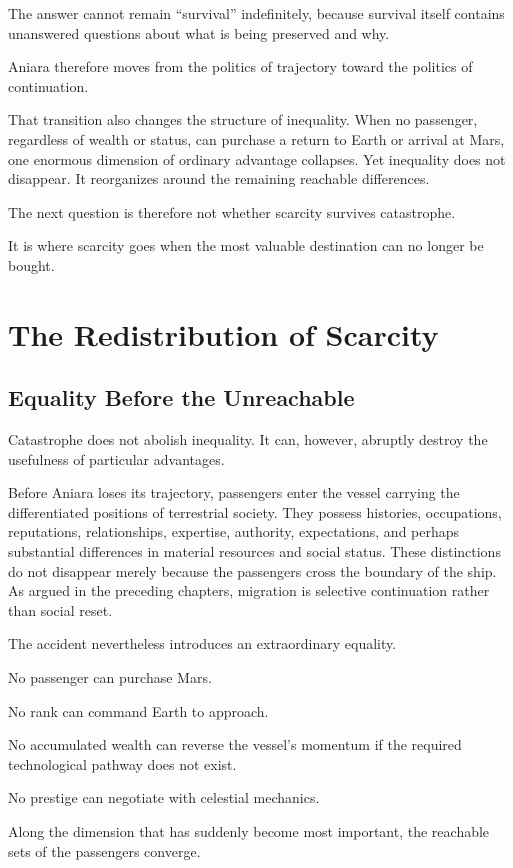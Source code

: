 \documentclass[11pt,oneside]{book}
\theoremstyle{definition}
\theoremstyle{remark}
\begin{document}
The answer cannot remain ``survival'' indefinitely, because survival itself contains unanswered questions about what is being preserved and why.

Aniara therefore moves from the politics of trajectory toward the politics of continuation.

That transition also changes the structure of inequality. When no passenger, regardless of wealth or status, can purchase a return to Earth or arrival at Mars, one enormous dimension of ordinary advantage collapses. Yet inequality does not disappear. It reorganizes around the remaining reachable differences.

The next question is therefore not whether scarcity survives catastrophe.

It is where scarcity goes when the most valuable destination can no longer be bought.

\chapter{The Redistribution of Scarcity}

\section{Equality Before the Unreachable}

Catastrophe does not abolish inequality. It can, however, abruptly destroy the usefulness of particular advantages.

Before Aniara loses its trajectory, passengers enter the vessel carrying the differentiated positions of terrestrial society. They possess histories, occupations, reputations, relationships, expertise, authority, expectations, and perhaps substantial differences in material resources and social status. These distinctions do not disappear merely because the passengers cross the boundary of the ship. As argued in the preceding chapters, migration is selective continuation rather than social reset.

The accident nevertheless introduces an extraordinary equality.

No passenger can purchase Mars.

No rank can command Earth to approach.

No accumulated wealth can reverse the vessel's momentum if the required technological pathway does not exist.

No prestige can negotiate with celestial mechanics.

Along the dimension that has suddenly become most important, the reachable sets of the passengers converge.
\end{document}
